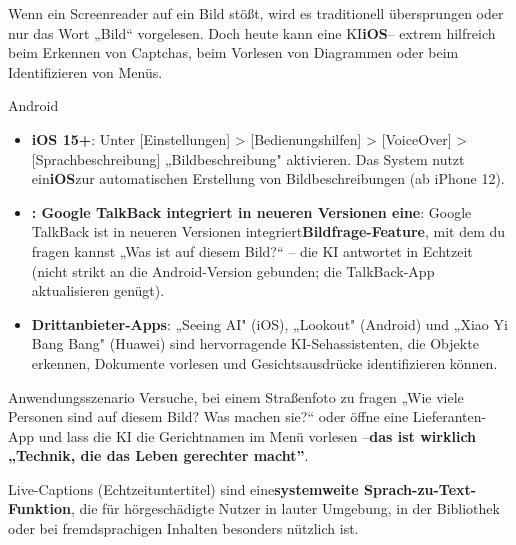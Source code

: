 Wenn ein Screenreader auf ein Bild stößt, wird es traditionell übersprungen oder nur das Wort „Bild“ vorgelesen. Doch heute kann eine KI\textbf{iOS}– extrem hilfreich beim Erkennen von Captchas, beim Vorlesen von Diagrammen oder beim Identifizieren von Menüs.

\begin{tcbinfo}{Android}
\begin{itemize}
  \item \textbf{iOS 15+}: Unter [Einstellungen] > [Bedienungshilfen] > [VoiceOver] > [Sprachbeschreibung] „Bildbeschreibung" aktivieren. Das System nutzt ein\textbf{iOS}zur automatischen Erstellung von Bildbeschreibungen (ab iPhone 12).
  \item \textbf{: Google TalkBack integriert in neueren Versionen eine}: Google TalkBack ist in neueren Versionen integriert\textbf{Bildfrage-Feature}, mit dem du fragen kannst „Was ist auf diesem Bild?“ – die KI antwortet in Echtzeit (nicht strikt an die Android-Version gebunden; die TalkBack-App aktualisieren genügt).
  \item \textbf{Drittanbieter-Apps}: „Seeing AI" (iOS), „Lookout" (Android) und „Xiao Yi Bang Bang" (Huawei) sind hervorragende KI-Sehassistenten, die Objekte erkennen, Dokumente vorlesen und Gesichtsausdrücke identifizieren können.
\end{itemize}

\end{tcbinfo}

\begin{tcbpractice}{Anwendungsszenario}
Versuche, bei einem Straßenfoto zu fragen „Wie viele Personen sind auf diesem Bild? Was machen sie?“ oder öffne eine Lieferanten-App und lass die KI die Gerichtnamen im Menü vorlesen –\textbf{das ist wirklich „Technik, die das Leben gerechter macht”}.

\end{tcbpractice}


Live-Captions (Echtzeituntertitel) sind eine\textbf{systemweite Sprach-zu-Text-Funktion}, die für hörgeschädigte Nutzer in lauter Umgebung, in der Bibliothek oder bei fremdsprachigen Inhalten besonders nützlich ist.

